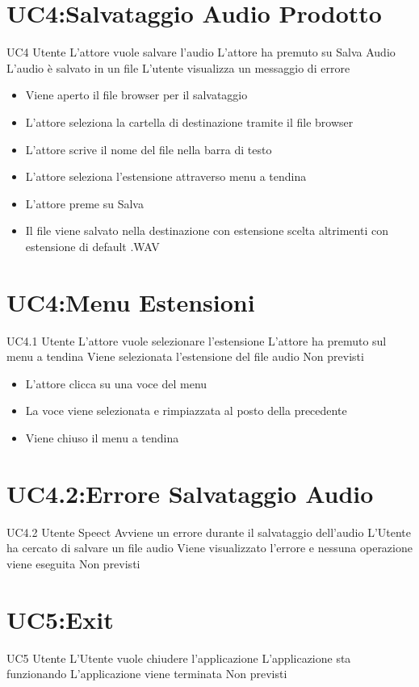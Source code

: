 \documentclass[../AnalisideiRequisiti.tex]{subfiles}
\begin{document}
\section{UC4:Salvataggio Audio Prodotto}
\UserCase
{UC4}
{Utente}
{}
{L'attore vuole salvare l'audio}
{L'attore ha premuto su Salva Audio}
{L'audio è salvato in un file}
{L'utente visualizza un messaggio di errore }
{
		\begin{itemize}
		\item{} Viene aperto il file browser per il salvataggio
		\item{} L'attore seleziona la cartella di destinazione tramite il file browser 
		\item{} L'attore scrive il nome del file nella barra di testo
		\item{} L'attore seleziona l'estensione attraverso menu a tendina
		\item{} L'attore preme su Salva 
		\item{} Il file viene salvato nella destinazione con estensione scelta altrimenti con estensione di default .WAV
\end{itemize}
}
\section{UC4:Menu Estensioni}
\UserCase
{UC4.1}
{Utente}
{}
{L'attore vuole selezionare l'estensione}
{L'attore ha premuto sul menu a tendina}
{Viene selezionata l'estensione del file audio}
{Non previsti}
{
\begin{itemize}
	\item{} L'attore clicca su una voce del menu
	\item{} La voce viene selezionata e rimpiazzata al posto della precedente
	\item{} Viene chiuso il menu a tendina

\end{itemize}
}		
\section{UC4.2:Errore Salvataggio Audio}
\UserCase
{UC4.2}
{Utente}
{Speect}
{Avviene un errore durante il salvataggio dell'audio}
{L'Utente ha cercato di salvare un file audio}
{Viene visualizzato l'errore e nessuna operazione viene eseguita}
{Non previsti}
{}

\section{UC5:Exit}
\UserCase
{UC5}
{Utente}
{}
{L'Utente vuole chiudere l'applicazione }
{L'applicazione sta funzionando}
{L'applicazione viene terminata}
{Non previsti}
{
}
\end{document}
